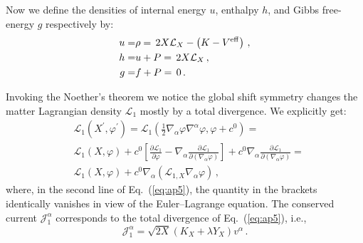 \documentclass[twocolumn,showpacs, nofootinbib,aps,superscriptaddress, eqsecnum,prd,prl,notitlepage,showkeys,10pt,reprint]{revtex4-1}
\begin{document}
Now we define the densities of internal energy $u$, enthalpy $h$, and Gibbs free-energy $g$ respectively by:
%
\begin{align}
\label{inendenty}
u = & \rho =\, 2X \mathcal{L}_X - \left(K-V^{\rm eff}\right)\,,\\
\label{enthalpydens}
h = & u + P =\, 2X \mathcal{L}_X\,,\\
\label{gibbsdens}
g = & f + P =\, 0\,.
\end{align}

Invoking the Noether's theorem we notice the global shift symmetry changes the matter Lagrangian density $\mathcal{L}_1$ mostly by a total divergence. We explicitly get:
%
\begin{align}
\nonumber
&\mathcal{L}_1\left(X^\prime,\varphi^\prime\right) =\mathcal{L}_1\left(\frac{1}{2}\nabla_\alpha\varphi \nabla^\alpha\varphi,\varphi+c^0\right)=\\
\nonumber
&\mathcal{L}_1\left(X,\varphi\right) + c^0\left[\frac{\partial\mathcal{L}_1}{\partial\varphi} - \nabla_\alpha\frac{\partial\mathcal{L}_1}{\partial\left(\nabla_\alpha\varphi\right)}\right] + c^0 \nabla_\alpha\frac{\partial\mathcal{L}_1}{\partial\left(\nabla_\alpha\varphi\right)}=\\
\label{eq:ap5}
&\mathcal{L}_1\left(X,\varphi\right) + c^0 \nabla_\alpha\left(\mathcal{L}_{1,X} \nabla_\alpha\varphi\right)\,,
\end{align}
%
where, in the second line of Eq.~(\ref{eq:ap5}), the quantity in the brackets identically vanishes in view of the Euler--Lagrange equation.
The conserved current $\mathcal{J}_1^\alpha$ corresponds to the total divergence of Eq.~(\ref{eq:ap5}), i.e.,
%
\begin{equation}
\label{eq:conscurr1}
\mathcal{J}_1^\alpha = \sqrt{2X} \left(K_X+\lambda Y_X\right) v^\alpha\,.
\end{equation}
\end{document}
